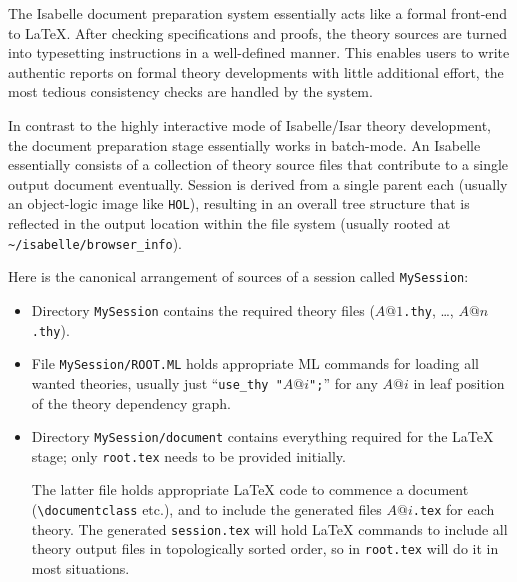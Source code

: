 \begin{isabellebody}
\begin{isamarkuptext}
  \medskip The Isabelle document preparation system essentially acts
  like a formal front-end to {\LaTeX}.  After checking specifications
  and proofs, the theory sources are turned into typesetting
  instructions in a well-defined manner.  This enables users to write
  authentic reports on formal theory developments with little
  additional effort, the most tedious consistency checks are handled
  by the system.%
\end{isamarkuptext}%
\isamarkuptrue%
%
\isamarkuptrue%
%
\begin{isamarkuptext}%
In contrast to the highly interactive mode of Isabelle/Isar theory
  development, the document preparation stage essentially works in
  batch-mode.  An Isabelle  essentially consists of a
  collection of theory source files that contribute to a single output
  document eventually.  Session is derived from a single parent each
  (usually an object-logic image like \texttt{HOL}), resulting in an
  overall tree structure that is reflected in the output location
  within the file system (usually rooted at
  \verb,~/isabelle/browser_info,).

  Here is the canonical arrangement of sources of a session called
  \texttt{MySession}:

  \begin{itemize}

  \item Directory \texttt{MySession} contains the required theory
  files ($A@1$\texttt{.thy}, \dots, $A@n$\texttt{.thy}).

  \item File \texttt{MySession/ROOT.ML} holds appropriate ML commands
  for loading all wanted theories, usually just
  ``\texttt{use_thy~"$A@i$";}'' for any $A@i$ in leaf position of the
  theory dependency graph.

  \item Directory \texttt{MySession/document} contains everything
  required for the {\LaTeX} stage; only \texttt{root.tex} needs to be
  provided initially.

  The latter file holds appropriate {\LaTeX} code to commence a
  document (\verb,\documentclass, etc.), and to include the generated
  files $A@i$\texttt{.tex} for each theory.  The generated
  \texttt{session.tex} will hold {\LaTeX} commands to include all
  theory output files in topologically sorted order, so
  \verb,, in \texttt{root.tex} will do it in most
  situations.


\end{itemize}
\end{isamarkuptext}
\end{isabellebody}
